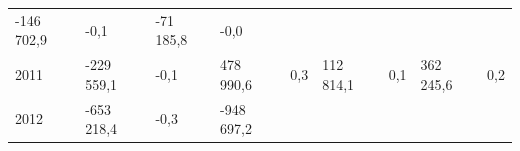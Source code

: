 \begin{longtable}[]{@{}lllllllll@{}}
\begin{minipage}[t]{0.12\columnwidth}
-146 702,9\strut
\end{minipage} & \begin{minipage}[t]{0.06\columnwidth}\raggedright
-0,1\strut
\end{minipage} & \begin{minipage}[t]{0.10\columnwidth}\raggedright
-71 185,8\strut
\end{minipage} & \begin{minipage}[t]{0.06\columnwidth}\raggedright
-0,0\strut
\end{minipage}\tabularnewline
\begin{minipage}[t]{0.05\columnwidth}\raggedright
2011\strut
\end{minipage} & \begin{minipage}[t]{0.10\columnwidth}\raggedright
-229 559,1\strut
\end{minipage} & \begin{minipage}[t]{0.06\columnwidth}\raggedright
-0,1\strut
\end{minipage} & \begin{minipage}[t]{0.16\columnwidth}\raggedright
478 990,6\strut
\end{minipage} & \begin{minipage}[t]{0.06\columnwidth}\raggedright
0,3\strut
\end{minipage} & \begin{minipage}[t]{0.12\columnwidth}\raggedright
112 814,1\strut
\end{minipage} & \begin{minipage}[t]{0.06\columnwidth}\raggedright
0,1\strut
\end{minipage} & \begin{minipage}[t]{0.10\columnwidth}\raggedright
362 245,6\strut
\end{minipage} & \begin{minipage}[t]{0.06\columnwidth}\raggedright
0,2\strut
\end{minipage}\tabularnewline
\begin{minipage}[t]{0.05\columnwidth}\raggedright
2012\strut
\end{minipage} & \begin{minipage}[t]{0.10\columnwidth}\raggedright
-653 218,4\strut
\end{minipage} & \begin{minipage}[t]{0.06\columnwidth}\raggedright
-0,3\strut
\end{minipage} & \begin{minipage}[t]{0.16\columnwidth}\raggedright
-948 697,2\strut

\end{minipage}
\end{longtable}

